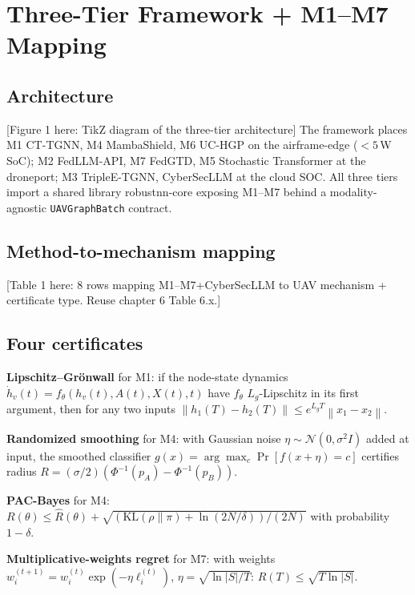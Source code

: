 \documentclass[10pt,journal,compsoc,twoside]{IEEEtran}
\newcommand{\Norm}[1]{\left\|#1\right\|}
\begin{document}
\section{Three-Tier Framework + M1--M7 Mapping}
\label{sec:framework}

\subsection{Architecture}
[Figure 1 here: TikZ diagram of the three-tier architecture]
The framework places M1 CT-TGNN, M4 MambaShield, M6 UC-HGP on the
airframe-edge ($<\!5$\,W SoC); M2 FedLLM-API, M7 FedGTD, M5 Stochastic
Transformer at the droneport; M3 TripleE-TGNN, CyberSecLLM at the
cloud SOC. All three tiers import a shared library
\textsf{robustnn-core} exposing M1--M7 behind a modality-agnostic
\texttt{UAVGraphBatch} contract.

\subsection{Method-to-mechanism mapping}
[Table 1 here: 8 rows mapping M1--M7+CyberSecLLM to UAV mechanism +
certificate type. Reuse chapter 6 Table 6.x.]

\subsection{Four certificates}
\textbf{Lipschitz--Gr\"onwall} for M1: if the node-state dynamics
$\dot h_v(t) = f_\theta(h_v(t), A(t), X(t), t)$ have $f_\theta$
$L_g$-Lipschitz in its first argument, then for any two inputs
$\Norm{h_1(T) - h_2(T)} \le e^{L_g T} \Norm{x_1 - x_2}$.

\textbf{Randomized smoothing} for M4: with Gaussian noise
$\eta \sim \mathcal{N}(0, \sigma^2 I)$ added at input, the smoothed
classifier $g(x) = \arg\max_c \Pr[f(x+\eta) = c]$ certifies radius
$R = (\sigma/2)(\Phi^{-1}(p_A) - \Phi^{-1}(p_B))$.

\textbf{PAC-Bayes} for M4: $R(\theta) \le \hat R(\theta) +
\sqrt{(\mathrm{KL}(\rho \| \pi) + \ln(2N/\delta))/(2N)}$ with
probability $1-\delta$.

\textbf{Multiplicative-weights regret} for M7: with weights
$w_i^{(t+1)} = w_i^{(t)} \exp(-\eta \ell_i^{(t)})$, $\eta =
\sqrt{\ln|S|/T}$: $R(T) \le \sqrt{T \ln|S|}$.

\end{document}
